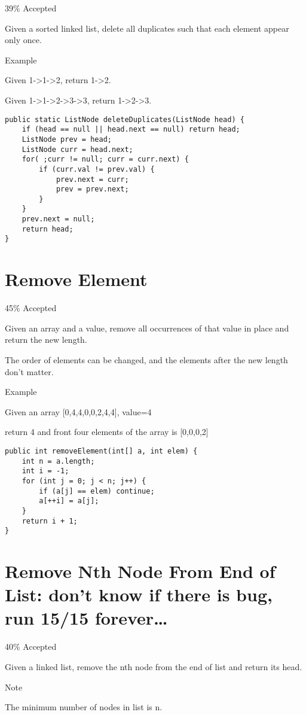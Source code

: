 \documentclass[9pt, b5paaper]{book}
\begin{document}
39\% Accepted

Given a sorted linked list, delete all duplicates such that each element appear only once.

Example

Given 1->1->2, return 1->2.

Given 1->1->2->3->3, return 1->2->3.
\begin{verbatim}
public static ListNode deleteDuplicates(ListNode head) {
    if (head == null || head.next == null) return head;
    ListNode prev = head;
    ListNode curr = head.next;
    for( ;curr != null; curr = curr.next) {
        if (curr.val != prev.val) {
            prev.next = curr;
            prev = prev.next;
        } 
    }
    prev.next = null;
    return head;
}
\end{verbatim}
\section{Remove Element}
\label{sec-5-57}

45\% Accepted

Given an array and a value, remove all occurrences of that value in place and return the new length.

The order of elements can be changed, and the elements after the new length don't matter.

Example

Given an array [0,4,4,0,0,2,4,4], value=4

return 4 and front four elements of the array is [0,0,0,2]
\begin{verbatim}
public int removeElement(int[] a, int elem) {            
    int n = a.length;
    int i = -1;
    for (int j = 0; j < n; j++) {
        if (a[j] == elem) continue;
        a[++i] = a[j];
    }
    return i + 1;
}
\end{verbatim}
\section{Remove Nth Node From End of List: don't know if there is bug, run 15/15 forever\ldots{}}
\label{sec-5-58}

40\% Accepted

Given a linked list, remove the nth node from the end of list and return its head.

Note

The minimum number of nodes in list is n.
\end{document}
